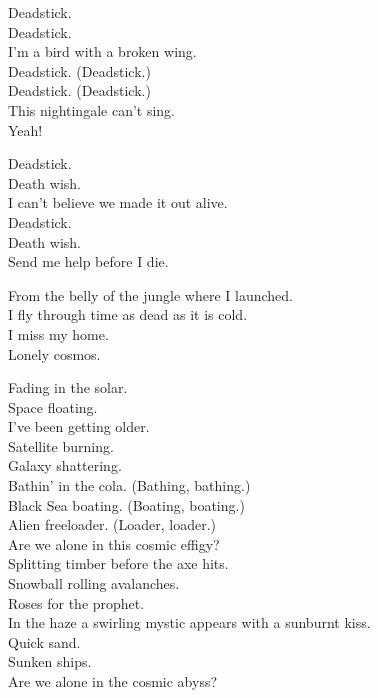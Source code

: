 
Deadstick. \\
Deadstick. \\
I'm a bird with a broken wing. \\
Deadstick. (Deadstick.) \\
Deadstick. (Deadstick.) \\
This nightingale can't sing. \\
Yeah! \\


Deadstick. \\
Death wish. \\
I can't believe we made it out alive. \\
Deadstick. \\
Death wish. \\
Send me help before I die. \\





From the belly of the jungle where I launched. \\
I fly through time as dead as it is cold. \\
I miss my home. \\
Lonely cosmos. \\


Fading in the solar. \\
Space  floating. \\
I've been getting older. \\
Satellite burning. \\
Galaxy shattering. \\
Bathin' in the cola. (Bathing, bathing.) \\
Black Sea boating. (Boating, boating.) \\
Alien freeloader. (Loader, loader.) \\
Are we alone in this cosmic effigy? \\

Splitting timber before the axe hits. \\
Snowball rolling avalanches. \\
Roses for the prophet. \\
In the haze a swirling mystic appears with a sunburnt kiss. \\
Quick sand. \\
Sunken ships. \\
Are we alone in the cosmic abyss? \\

